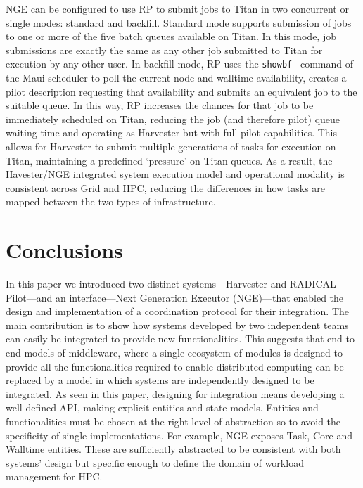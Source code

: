 \documentclass{webofc}
\begin{document}
NGE can be configured to use RP to submit jobs to Titan in two concurrent or
single modes: standard and backfill. Standard mode supports submission of
jobs to one or more of the five batch queues available on Titan. In this
mode, job submissions are exactly the same as any other job submitted to
Titan for execution by any other user. In backfill mode, RP uses the
\texttt{showbf}~\cite{showbf} command of the Maui scheduler to poll the
current node and walltime availability, creates a pilot description
requesting that availability and submits an equivalent job to the suitable
queue. In this way, RP increases the chances for that job to be immediately
scheduled on Titan, reducing the job (and therefore pilot) queue waiting time
and operating as Harvester but with full-pilot capabilities. This allows for
Harvester to submit multiple generations of tasks for execution on Titan,
maintaining a predefined ‘pressure’ on Titan queues. As a result, the
Havester/NGE integrated system execution model and operational modality is
consistent across Grid and HPC, reducing the differences in how tasks are
mapped between the two types of infrastructure.


\section{Conclusions}

In this paper we introduced two distinct systems---Harvester and
RADICAL-Pilot---and an interface---Next Generation Executor (NGE)---that
enabled the design and implementation of a coordination protocol for their
integration. The main contribution is to show how systems developed by two
independent teams can easily be integrated to provide new functionalities.
This suggests that end-to-end models of middleware, where a single ecosystem
of modules is designed to provide all the functionalities required to enable
distributed computing can be replaced by a model in which systems are
independently designed to be integrated. As seen in this paper, designing for
integration means developing a well-defined API, making explicit entities and
state models. Entities and functionalities must be chosen at the right level
of abstraction so to avoid the specificity of single implementations. For
example, NGE exposes Task, Core and Walltime entities. These are sufficiently
abstracted to be consistent with both systems’ design but specific enough to
define the domain of workload management for HPC.
\end{document}
